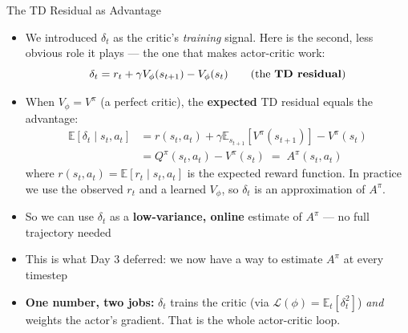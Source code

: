 \begin{frame}{The TD Residual as Advantage}
\begin{itemize}
    \item We introduced $\delta_t$ as the critic's \emph{training} signal. Here is the second, less obvious role it plays --- the one that makes actor-critic work:
    $$\delta_t = r_t + \gamma V_\phi(s_{t+1}) - V_\phi(s_t) \qquad \text{(the \textbf{TD residual})}$$
    \item When $V_\phi = V^{\pi}$ (a perfect critic), the \textbf{expected} TD residual equals the advantage:
    \begin{align*}
        \mathbb{E}\!\left[\delta_t \mid s_t, a_t\right]
        &= r(s_t,a_t) + \gamma \mathbb{E}_{s_{t+1}}\!\left[V^{\pi}(s_{t+1})\right] - V^{\pi}(s_t) \\
        &= Q^{\pi}(s_t,a_t) - V^{\pi}(s_t) \;=\; A^{\pi}(s_t,a_t)
    \end{align*}
    where $r(s_t,a_t) = \mathbb{E}[r_t \mid s_t, a_t]$ is the expected reward function. In practice we use the observed $r_t$ and a learned $V_\phi$, so $\delta_t$ is an approximation of $A^{\pi}$.
    \pause
    \item So we can use $\delta_t$ as a \textbf{low-variance, online} estimate of $A^{\pi}$ --- no full trajectory needed
    \item This is what Day 3 deferred: we now have a way to estimate $A^{\pi}$ at every timestep
    \vspace{0.5em}
    \item \textbf{One number, two jobs:} $\delta_t$ trains the critic (via $\mathcal{L}(\phi) = \mathbb{E}_t[\delta_t^2]$) \emph{and} weights the actor's gradient. That is the whole actor-critic loop.
\end{itemize}
\end{frame}

